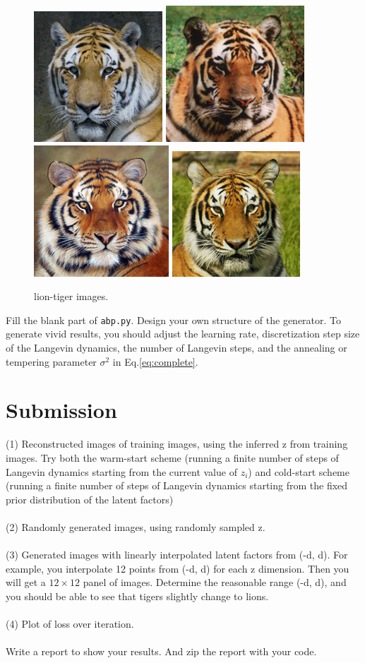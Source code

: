 \documentclass[11pt]{article}
\begin{document}
\begin{figure}[h]
{    	\includegraphics[width=.155\linewidth]{images/tiger_3.jpg}
    	\includegraphics[width=.16\linewidth]{images/tiger_4.jpg}
    	\includegraphics[width=.162\linewidth]{images/tiger_5.jpg}
    	\includegraphics[width=.16\linewidth]{images/tiger_6.jpg}
    }\\[3px]
	\caption{lion-tiger images.}
\end{figure}

Fill the blank part of \texttt{abp.py}. Design your own structure of the generator. To generate vivid results, you should adjust the learning rate, discretization step size of the Langevin dynamics, the number of Langevin steps, and the annealing or tempering parameter $\sigma^2$ in Eq.\ref{eq:complete}.

\section{Submission}

(1) Reconstructed images of training images, using the inferred z from training images. Try both the warm-start scheme (running a finite number of steps of Langevin dynamics starting from the current value of $z_i$) and cold-start scheme (running a finite number of steps of Langevin dynamics starting from the fixed prior distribution of the latent factors)
\\~\\
(2) Randomly generated images, using randomly sampled z.
\\~\\
(3) Generated images with linearly interpolated latent factors from (-d, d).
For example, you interpolate 12 points from (-d, d) for each z dimension. Then you
will get a $12 \times 12$ panel of images. Determine the reasonable range (-d, d), and you should be able to see that tigers slightly change to lions.
\\~\\
(4) Plot of loss over iteration.
\\~\\
Write a report to show your results. And zip the report with your code.
\end{document}
